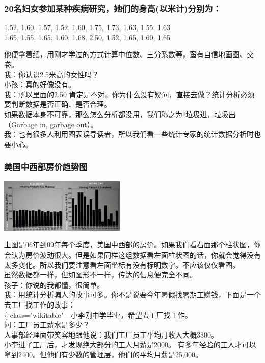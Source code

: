 \hypertarget{ux540dux5987ux5973ux53c2ux52a0ux67d0ux79cdux75beux75c5ux7814ux7a76ux5979ux4eecux7684ux8eabux9ad8ux4ee5ux7c73ux8ba1ux5206ux522bux4e3a}{%
\subsubsection{20名妇女参加某种疾病研究，她们的身高(以米计)分别为：}\label{ux540dux5987ux5973ux53c2ux52a0ux67d0ux79cdux75beux75c5ux7814ux7a76ux5979ux4eecux7684ux8eabux9ad8ux4ee5ux7c73ux8ba1ux5206ux522bux4e3a}}

1.52, 1.60, 1.57, 1.52, 1.60, 1.75, 1.73, 1.63, 1.55, 1.63\\
1.65, 1.55, 1.65, 1.60, 1.68, 2.50, 1.52, 1.65, 1.60, 1.65

他便拿着纸，用刚才学过的方式计算中位数、三分系数等，蛮有自信地画图、交卷。\\
我：你认识2.5米高的女性吗？\\
小孩：真的好像没有。\\
我：所以里面的2.50
肯定是不对。你为什么没有疑问，直接去做？统计分析必须要判断数据是否正确、是否合理。\\
如果数据本身不可靠，那么怎么分析都没用，我们称之为``垃圾进，垃圾出（Garbage
in, garbage out）。\\
我：也有很多人利用图表误导读者，所以我们看一些统计专家的统计数据分析时也要小心。\\

\hypertarget{ux7f8eux56fdux4e2dux897fux90e8ux623fux4ef7ux8d8bux52bfux56fe}{%
\subsubsection{美国中西部房价趋势图}\label{ux7f8eux56fdux4e2dux897fux90e8ux623fux4ef7ux8d8bux52bfux56fe}}


\includegraphics[width=6cm]{Stat_f22-1_12.jpg}

上图是06年到09年每个季度，美国中西部的房价。如果我们看右面那个柱状图，你会认为房价波动很大。但是如果同样这组数据看左面柱状图的话，你就会觉得没有太多变化。所以我们要注意看左面坐标有没有标明数字。不应该仅仅看图。\\
虽然数据都一样，但如图形不一样，传达的信息便完全不同。\\
孩子：你说的我都懂，很简单。\\
我：用统计分析骗人的故事可多。你不是说要今年暑假找暑期工赚钱，下面是一个去工厂找工作的故事：\\
\{\textbar{} class="wikitable" \textbar{}-
\textbar{}小李刚中学毕业，希望去工厂找工作。\\
问：工厂员工薪水是多少？\\
人事部经理面带笑容地跟他说：我们工厂员工平均月收入大概3300。\\
小李进了工厂后，才发现绝大部分的工人月薪是2000。
有多年经验的工人才可以拿到2400。但他们有少数的管理层，他们的平均月薪是25,000。

